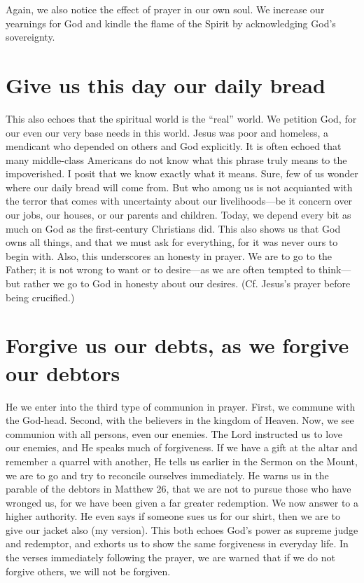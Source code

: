 \documentclass[12pt]{article}
\begin{document}
Again, we also notice the effect of prayer in our own soul. We increase our yearnings for God and kindle the flame of the Spirit by acknowledging God's sovereignty.

\section{Give us this day our daily bread}

This also echoes that the spiritual world is the ``real'' world.  We petition God, for our even our very base needs in this world.  Jesus was poor and homeless, a mendicant who depended on others and God explicitly.  It is often echoed that many middle-class Americans do not know what this phrase truly means to the impoverished.  I posit that we know exactly what it means.  Sure, few of us wonder where our daily bread will come from.  But who among us is not acquianted with the terror that comes with uncertainty about our livelihoods---be it concern over our jobs, our houses, or our parents and children.  Today, we depend every bit as much on God as the first-century Christians did.  This also shows us that God owns all things, and that we must ask for everything, for it was never ours to begin with.  Also, this underscores an honesty in prayer.  We are to go to the Father; it is not wrong to want or to desire---as we are often tempted to think---but rather we go to God in honesty about our desires.  (Cf. Jesus's prayer before being crucified.)

\section{Forgive us our debts, as we forgive our debtors}

He we enter into the third type of communion in prayer.  First, we commune with the God-head.  Second, with the believers in the kingdom of Heaven.  Now, we see communion with all persons, even our enemies.  The Lord instructed us to love our enemies, and He speaks much of forgiveness.  If we have a gift at the altar and remember a quarrel with another, He tells us earlier in the Sermon on the Mount, we are to go and try to reconcile ourselves immediately.  He warns us in the parable of the debtors in Matthew 26, that we are not to pursue those who have wronged us, for we have been given a far greater redemption.  We now answer to a higher authority.  He even says if someone sues us for our shirt, then we are to give our jacket also (my version).  This both echoes God's power as supreme judge and redemptor, and exhorts us to show the same forgiveness in everyday life.  In the verses immediately following the prayer, we are warned that if we do not forgive others, we will not be forgiven.
\end{document}
